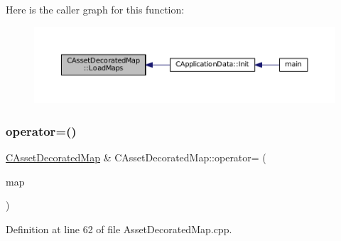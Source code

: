 Here is the caller graph for this function\+:\nopagebreak
\begin{figure}[H]
\begin{center}
\leavevmode
\includegraphics[width=350pt]{classCAssetDecoratedMap_a03b043bddf72e2d97171b704f538f4d0_icgraph}
\end{center}
\end{figure}
\hypertarget{classCAssetDecoratedMap_a0330faaf18f597b5e2ebbbfcd8bf2819}{}\label{classCAssetDecoratedMap_a0330faaf18f597b5e2ebbbfcd8bf2819} 
\subsubsection{\texorpdfstring{operator=()}{operator=()}}
{\footnotesize\ttfamily \hyperlink{classCAssetDecoratedMap}{C\+Asset\+Decorated\+Map} \& C\+Asset\+Decorated\+Map\+::operator= (\begin{DoxyParamCaption}\item[{const \hyperlink{classCAssetDecoratedMap}{C\+Asset\+Decorated\+Map} \&}]{map }\end{DoxyParamCaption})}



Definition at line 62 of file Asset\+Decorated\+Map.\+cpp.


